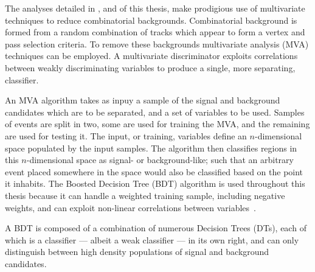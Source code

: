 The analyses detailed in ,  and  of this thesis, make
prodigious use of multivariate techniques to reduce combinatorial backgrounds.
Combinatorial background is formed from a random combination of tracks which appear to form a
vertex and pass selection criteria.
To remove these backgrounds multivariate analysis (MVA) techniques can be employed.
A multivariate discriminator exploits correlations between weakly discriminating variables to
produce a single, more separating, classifier.

An MVA algorithm takes as inpuy a sample of the signal and background candidates which are to be
separated, and a set of variables to be used.
Samples of events are split in two, some are used for training the MVA, and the remaining are used
for testing it.
The input, or training, variables define an $n$-dimensional space populated by the input samples.
The algorithm then classifies regions in this $n$-dimensional space as signal- or background-like;
such that an arbitrary event placed somewhere in the space would also be classified based on the
point it inhabits.
The Boosted Decision Tree (BDT) algorithm is used throughout this thesis because it can handle
a weighted training sample, including negative weights, and can exploit non-linear correlations
between variables~\cite{Breiman,Roe}.

A BDT is composed of a combination of numerous Decision Trees (DTs), each of which is a classifier
--- albeit a weak classifier ---
in its own right, and can only distinguish between high density populations of signal and
background candidates.

